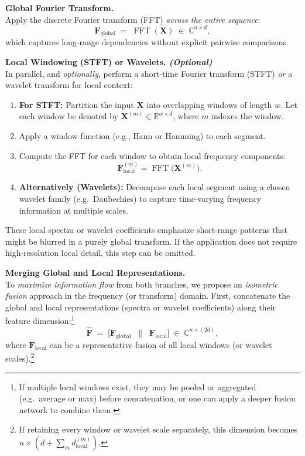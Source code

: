 \textbf{ Global Fourier Transform.}\\
Apply the discrete Fourier transform (FFT) \emph{across the entire sequence}:
\[
\mathbf{F}_{\mathrm{global}} \;=\; \operatorname{FFT}(\mathbf{X}) \;\in\; \mathbb{C}^{n \times d},
\]
which captures long-range dependencies without explicit pairwise comparisons.

\textbf{ Local Windowing (STFT) or Wavelets. \emph{(Optional)}}\\
In parallel, and \emph{optionally}, perform a short-time Fourier transform (STFT) \emph{or} a wavelet transform for local context:
\begin{enumerate}
    \item \textbf{For STFT:} Partition the input \(\mathbf{X}\) into overlapping windows of length \(w\). Let each window be denoted by \(\mathbf{X}^{(m)} \in \mathbb{R}^{w \times d}\), where \(m\) indexes the window.
    \item Apply a window function (e.g., Hann or Hamming) to each segment.
    \item Compute the FFT for each window to obtain local frequency components:
    \[
      \mathbf{F}_{\mathrm{local}}^{(m)} = \operatorname{FFT}\bigl(\mathbf{X}^{(m)}\bigr).
    \]
    \item \textbf{Alternatively (Wavelets):} Decompose each local segment using a chosen wavelet family (e.g.\ Daubechies) to capture time-varying frequency information at multiple scales.
\end{enumerate}
These local spectra or wavelet coefficients emphasize short-range patterns that might be blurred in a purely global transform. If the application does not require high-resolution local detail, this step can be omitted.

\textbf{ Merging Global and Local Representations.}\\
To \emph{maximize information flow} from both branches, we propose an \emph{isometric fusion} approach in the frequency (or transform) domain. First, concatenate the global and local representations (spectra or wavelet coefficients) along their feature dimension:\footnote{If multiple local windows exist, they may be pooled or aggregated (e.g.\ average or max) before concatenation, or one can apply a deeper fusion network to combine them.}
\[
\hat{\mathbf{F}} \;=\; \bigl[\mathbf{F}_{\mathrm{global}} \;\;\|\;\; \mathbf{F}_{\mathrm{local}}\bigr] 
\;\in\; \mathbb{C}^{n \times (2d)},
\]
where \(\mathbf{F}_{\mathrm{local}}\) can be a representative fusion of all local windows (or wavelet scales).\footnote{If retaining every window or wavelet scale separately, this dimension becomes \(n \times (d + \sum_m d_{\mathrm{local}}^{(m)})\).}

